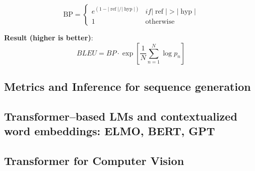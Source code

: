 \documentclass[10pt]{article}
\begin{document}
\begin{equation*}
\text{BP}=
\begin{cases}
 e^{(1-|\operatorname{ref}|/|\operatorname{hyp}|)} & if |\operatorname{ref}|>|\operatorname{hyp}| \\
  1 & \operatorname{otherwise} 
\end{cases}
\end{equation*}

\textbf{Result (higher is better)}:
\begin{equation*}
BLEU=BP\cdot\exp \left[\frac{1}{N} \sum\limits_{n=1}^{N}\log p_{n}\right]
\end{equation*}






\subsection{Metrics and Inference for sequence generation}



\subsection{Transformer--based LMs and contextualized word embeddings: ELMO, BERT, GPT}



\subsection{Transformer for Computer Vision}
\end{document}
